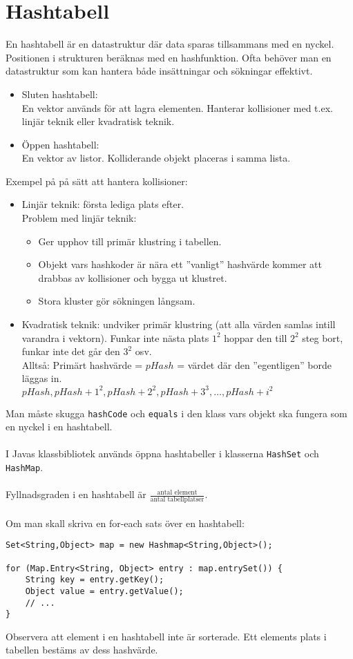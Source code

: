 \documentclass[11pt]{article}
\begin{document}
\section{Hashtabell}
En hashtabell är en datastruktur där data sparas tillsammans med en nyckel. Positionen i strukturen beräknas med en hashfunktion. Ofta behöver man en datastruktur som kan hantera både insättningar och sökningar effektivt.
\begin{itemize}
\item{Sluten hashtabell: \\
	En vektor används för att lagra elementen. Hanterar kollisioner med t.ex. linjär teknik eller kvadratisk teknik. }
\item{Öppen hashtabell: \\
	En vektor av listor. Kolliderande objekt placeras i samma lista. }
\end{itemize}
Exempel på på sätt att hantera kollisioner:
\begin{itemize}
\item{Linjär teknik: första lediga plats efter. \\
	Problem med linjär teknik:
	\begin{itemize}
	\item{Ger upphov till primär klustring i tabellen.}
	\item{Objekt vars hashkoder är nära ett ''vanligt'' hashvärde kommer att drabbas av kollisioner och bygga ut klustret.}
	\item{Stora kluster gör sökningen långsam.}
	\end{itemize}
}
\item{Kvadratisk teknik: undviker primär klustring (att alla värden samlas intill varandra i vektorn). Funkar inte nästa plats $1^2$ hoppar den till $2^2$ steg bort, funkar inte det går den $3^2$ osv. \\
Alltså: Primärt hashvärde = $pHash$ = värdet där den ''egentligen'' borde läggas in. \\
	$pHash, pHash + 1^2, pHash +2^2, pHash +3^3, \dots, pHash +i^2$
}
\end{itemize}Man måste skugga \verb+hashCode+ och \verb+equals+ i den klass vars objekt ska fungera som en nyckel i en hashtabell. \\ \\
I Javas klassbibliotek används öppna hashtabeller i klasserna \verb+HashSet+ och \verb+HashMap+. \\ \\
Fyllnadsgraden i en hashtabell är $\frac{\text{antal element}}{\text{antal tabellplatser}}$.  \\ \\
Om man skall skriva en for-each sats över en hashtabell:
\begin{lstlisting}
Set<String,Object> map = new Hashmap<String,Object>();

for (Map.Entry<String, Object> entry : map.entrySet()) {
    String key = entry.getKey();
    Object value = entry.getValue();
    // ...
}
\end{lstlisting}
Observera att element i en hashtabell inte är sorterade. Ett elements plats i tabellen bestäms av dess hashvärde. 
\end{document}
